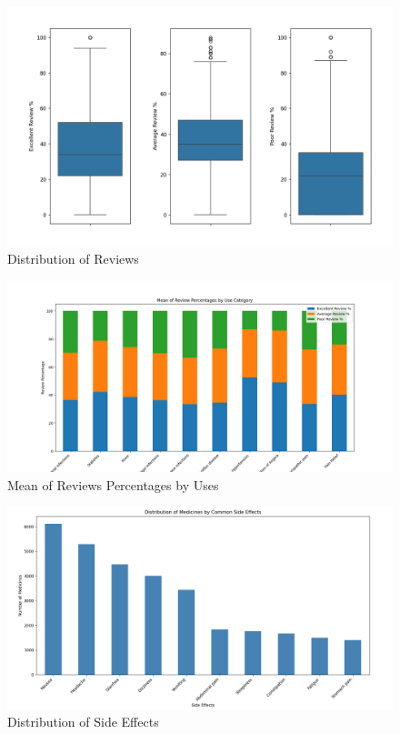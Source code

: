 \documentclass[sigconf]{acmart}
\begin{document}
\begin{figure}[H]
	\centering
	\includegraphics[width=\linewidth]{graphic2.png}
	\caption{Distribution of Reviews}
	\label{fig:uml}
  \end{figure}

\begin{figure}[H]
	\centering
	\includegraphics[width=\linewidth]{graphic3.png}
	\caption{Mean of Reviews Percentages by Uses}
	\label{fig:uml}
  \end{figure}

\begin{figure}[H]
	\centering
	\includegraphics[width=\linewidth]{graphic4.png}
	\caption{Distribution of Side Effects}
	\label{fig:uml}
  \end{figure}
\end{document}
